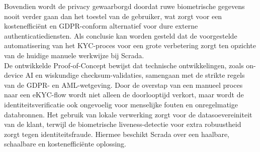 Bovendien wordt de privacy gewaarborgd doordat ruwe biometrische gegevens nooit verder gaan dan het toestel van de gebruiker, wat zorgt voor een kostenefficiënt en GDPR-conform alternatief voor dure externe authenticatiediensten.
Als conclusie kan worden gesteld dat de voorgestelde automatisering van het KYC-proces voor een grote verbetering zorgt ten opzichte van de huidige manuele werkwijze bij Scrada. \\
De ontwikkelde Proof-of-Concept bewijst dat technische ontwikkelingen, zoals on-device AI en wiskundige checksum-validaties, 
samengaan met de strikte regels van de GDPR- en AML-wetgeving. Door de overstap van een manueel proces naar een eKYC-flow wordt niet alleen de doorlooptijd verkort, 
maar wordt de identiteitsverificatie ook ongevoelig voor menselijke fouten en onregelmatige databronnen. 
Het gebruik van lokale verwerking zorgt voor de datasoevereiniteit van de klant, terwijl de biometrische liveness-detectie voor extra robuustheid zorgt tegen identiteitsfraude. 
Hiermee beschikt Scrada over een haalbare, schaalbare en kostenefficiënte oplossing.